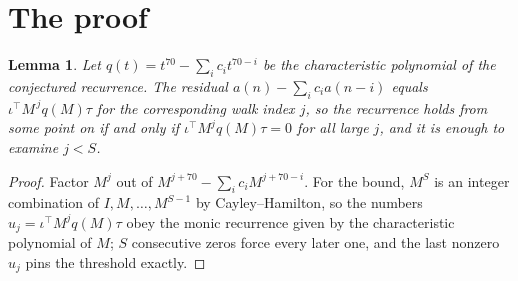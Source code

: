 \documentclass[11pt,a4paper]{article}
\theoremstyle{plain}
\newtheorem{lemma}[theorem]{Lemma}
\theoremstyle{definition}
\begin{document}
\section{The proof}

\begin{lemma}\label{lem:crit}
Let $q(t)=t^{70}-\sum_i c_it^{70-i}$ be the characteristic polynomial of the
conjectured recurrence. The residual $a(n)-\sum_ic_ia(n-i)$ equals
$\iota^{\!\top}M^{\,j}q(M)\tau$ for the corresponding walk index $j$, so the recurrence
holds from some point on if and only if $\iota^{\!\top}M^{j}q(M)\tau=0$ for all large $j$,
and it is enough to examine $j<S$.
\end{lemma}

\begin{proof}
Factor $M^{j}$ out of $M^{j+70}-\sum_ic_iM^{j+70-i}$. For the bound, $M^{S}$
is an integer combination of $I,M,\dots,M^{S-1}$ by Cayley--Hamilton, so the numbers
$u_j=\iota^{\!\top}M^{j}q(M)\tau$ obey the monic recurrence given by the characteristic
polynomial of $M$; $S$ consecutive zeros force every later one, and the last nonzero $u_j$
pins the threshold exactly.
\end{proof}
\end{document}
